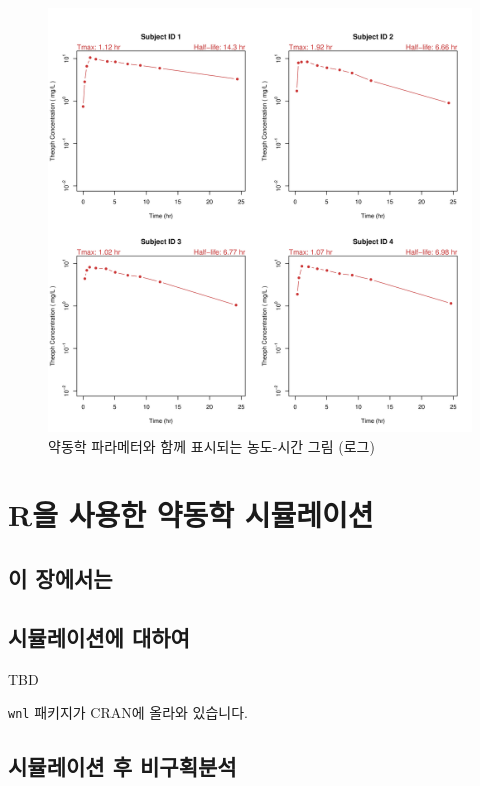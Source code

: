 \documentclass[12pt,]{krantz}
\theoremstyle{definition}
\theoremstyle{definition}
\theoremstyle{definition}
\theoremstyle{remark}
\begin{document}
\begin{figure}
\centering
\includegraphics{Output/Individual_PK_Log_10_Scale_for_Theoph00.png}
\caption{\label{fig:unnamed-chunk-23}약동학 파라메터와 함께 표시되는
농도-시간 그림 (로그)}
\end{figure}

\chapter{R을 사용한 약동학 시뮬레이션}\label{simulation}

\section{이 장에서는}\label{summary-simulation}

\section{시뮬레이션에 대하여}\label{-}

TBD

\texttt{wnl} 패키지가 CRAN에 올라와 있습니다.

\section{시뮬레이션 후 비구획분석}\label{--}
\end{document}
